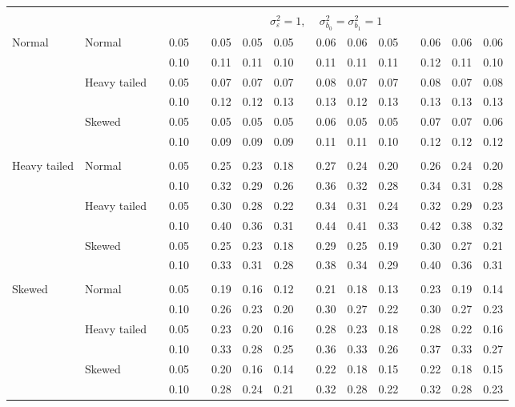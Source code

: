 \documentclass[12pt]{article} %
\begin{document}
\begin{table}[ht]
\begin{scriptsize}
\begin{center}
\begin{tabular}{ll p{.1cm} c p{.1cm} rrr p{.1cm} rrr p{.1cm} rrr}
&&&&&&&&&&&&&&&\\
& && && \multicolumn{9}{c}{$\sigma_{\varepsilon}^2 = 1$, \ \ $\sigma_{b_0}^2 = \sigma_{b_1}^2 = 1$} \\ \cline{6-16}
\rowcolor{gray!20}Normal       & Normal       && 0.05 &&   0.05 & 0.05 & 0.05 && 0.06 & 0.06 & 0.05 &&  0.06 & 0.06 & 0.06 \\
\rowcolor{gray!20}             &              && 0.10 &&   0.11 & 0.11 & 0.10 && 0.11 & 0.11 & 0.11 &&  0.12 & 0.11 & 0.10 \\
\rowcolor{gray!20}             & Heavy tailed && 0.05 &&   0.07 & 0.07 & 0.07 && 0.08 & 0.07 & 0.07 &&  0.08 & 0.07 & 0.08 \\
\rowcolor{gray!20}             &              && 0.10 &&   0.12 & 0.12 & 0.13 && 0.13 & 0.12 & 0.13 &&  0.13 & 0.13 & 0.13 \\
\rowcolor{gray!20}             & Skewed       && 0.05 &&   0.05 & 0.05 & 0.05 && 0.06 & 0.05 & 0.05 &&  0.07 & 0.07 & 0.06 \\
\rowcolor{gray!20}             &              && 0.10 &&   0.09 & 0.09 & 0.09 && 0.11 & 0.11 & 0.10 &&  0.12 & 0.12 & 0.12 \\
             &&&&&&&&&&&&&&&\\
Heavy tailed & Normal       && 0.05 &&   0.25 & 0.23 & 0.18 && 0.27 & 0.24 & 0.20 &&  0.26 & 0.24 & 0.20 \\
             &              && 0.10 &&   0.32 & 0.29 & 0.26 && 0.36 & 0.32 & 0.28 &&  0.34 & 0.31 & 0.28 \\
             & Heavy tailed && 0.05 &&   0.30 & 0.28 & 0.22 && 0.34 & 0.31 & 0.24 &&  0.32 & 0.29 & 0.23 \\
             &              && 0.10 &&   0.40 & 0.36 & 0.31 && 0.44 & 0.41 & 0.33 &&  0.42 & 0.38 & 0.32 \\
             & Skewed       && 0.05 &&   0.25 & 0.23 & 0.18 && 0.29 & 0.25 & 0.19 &&  0.30 & 0.27 & 0.21 \\
             &              && 0.10 &&   0.33 & 0.31 & 0.28 && 0.38 & 0.34 & 0.29 &&  0.40 & 0.36 & 0.31 \\
             &&&&&&&&&&&&&&&\\
Skewed       & Normal       && 0.05 &&   0.19 & 0.16 & 0.12 && 0.21 & 0.18 & 0.13 && 0.23 & 0.19 & 0.14 \\
             &              && 0.10 &&   0.26 & 0.23 & 0.20 && 0.30 & 0.27 & 0.22 && 0.30 & 0.27 & 0.23 \\
             & Heavy tailed && 0.05 &&   0.23 & 0.20 & 0.16 && 0.28 & 0.23 & 0.18 && 0.28 & 0.22 & 0.16 \\
             &              && 0.10 &&   0.33 & 0.28 & 0.25 && 0.36 & 0.33 & 0.26 && 0.37 & 0.33 & 0.27 \\
             & Skewed       && 0.05 &&   0.20 & 0.16 & 0.14 && 0.22 & 0.18 & 0.15 && 0.22 & 0.18 & 0.15 \\
             &              && 0.10 &&   0.28 & 0.24 & 0.21 && 0.32 & 0.28 & 0.22 && 0.32 & 0.28 & 0.23 \\



\end{tabular}
\end{center}
\end{scriptsize}
\end{table}
\end{document}
